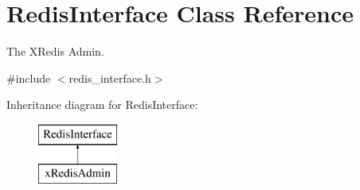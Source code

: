 \hypertarget{classRedisInterface}{\section{Redis\-Interface Class Reference}
\label{classRedisInterface}
}


The X\-Redis Admin.  




{\ttfamily \#include $<$redis\-\_\-interface.\-h$>$}

Inheritance diagram for Redis\-Interface\-:\begin{figure}[H]
\begin{center}
\leavevmode
\includegraphics[height=2.000000cm]{classRedisInterface}
\end{center}
\end{figure}
